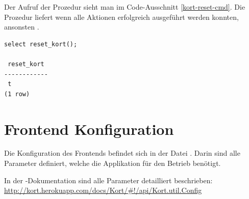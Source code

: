 Der Aufruf der Prozedur sieht man im Code-Ausschnitt \ref{kort-reset-cmd}.
Die Prozedur liefert  wenn alle Aktionen erfolgreich ausgeführt werden konnten, ansonsten .
\begin{lstlisting}[float, caption=Aufruf von reset\_kort(){,} um die Applikation zurückzusetzen, label=kort-reset-cmd]
select reset_kort();

 reset_kort 
------------
 t
(1 row)
\end{lstlisting}

\section{Frontend Konfiguration}
\label{frontend-config}
Die Konfiguration des Frontends befindet sich in der Datei .
Darin sind alle Parameter definiert, welche die Applikation für den Betrieb benötigt.

In der \kort{}-Dokumentation sind alle Parameter detailliert beschrieben: \url{http://kort.herokuapp.com/docs/Kort/#!/api/Kort.util.Config}